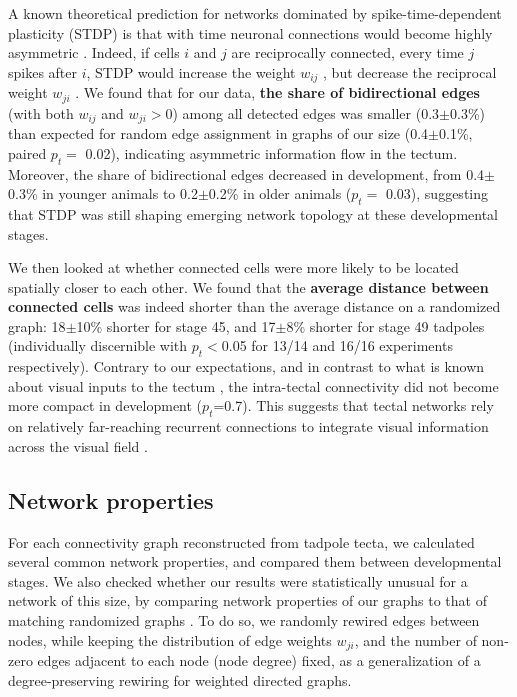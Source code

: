 \documentclass{article}
\begin{document}
A known theoretical prediction for networks dominated by spike-time-dependent plasticity (STDP) is that with time neuronal connections would become highly asymmetric \citep{pratt2008recurrent, richards2010stdp}. Indeed, if cells $i$ and $j$ are reciprocally connected, every time $j$ spikes after $i$, STDP would increase the weight $w_{ij}$ , but decrease the reciprocal weight $w_{ji}$ \citep{abbott1996ltpsequence, fiete2010chains}. We found that for our data, \textbf{the share of bidirectional edges} (with both $w_{ij}$ and $w_{ji}>$0) among all detected edges was smaller (0.3$\pm$0.3\%) than expected for random edge assignment in graphs of our size (0.4$\pm$0.1\%, paired $p_t=$ 0.02), indicating asymmetric information flow in the tectum. Moreover, the share of bidirectional edges decreased in development, from 0.4$\pm$0.3\% in younger animals to 0.2$\pm$0.2\% in older animals ($p_t=$ 0.03), suggesting that STDP was still shaping emerging network topology at these developmental stages.

We then looked at whether connected cells were more likely to be located spatially closer to each other. We found that the \textbf{average distance between connected cells} was indeed shorter than the average distance on a randomized graph: 18$\pm$10\% shorter for stage 45, and 17$\pm$8\% shorter for stage 49 tadpoles (individually discernible with $p_t<$0.05 for 13/14 and 16/16 experiments respectively). Contrary to our expectations, and in contrast to what is known about visual inputs to the tectum \citep{tao2005refinement}, the intra-tectal connectivity did not become more compact in development ($p_t$=0.7). This suggests that tectal networks rely on relatively far-reaching recurrent connections to integrate visual information across the visual field \citep{baginskas2009recurrent, liu2016jumbo, jang2016}.

\subsection*{Network properties}

For each connectivity graph reconstructed from tadpole tecta, we calculated several common network properties, and compared them between developmental stages. We also checked whether our results were statistically unusual for a network of this size, by comparing network properties of our graphs to that of matching randomized graphs \citep{ansmann2012surrogate}. To do so, we randomly rewired edges between nodes, while keeping the distribution of edge weights $w_{ji}$, and the number of non-zero edges adjacent to each node (node degree) fixed, as a generalization of a degree-preserving rewiring \citep{maslov2002} for weighted directed graphs. 
\end{document}
